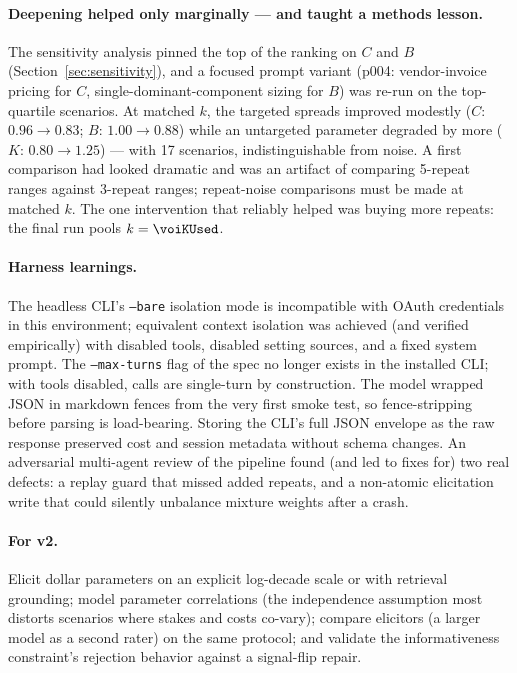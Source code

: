 \paragraph{Deepening helped only marginally --- and taught a methods lesson.}
The sensitivity analysis pinned the top of the ranking on $C$ and $B$
(Section~\ref{sec:sensitivity}), and a focused prompt variant (p004:
vendor-invoice pricing for $C$, single-dominant-component sizing for $B$) was
re-run on the top-quartile scenarios. At matched $k$, the targeted spreads
improved modestly ($C$: $0.96 \to 0.83$; $B$: $1.00 \to 0.88$) while an
untargeted parameter degraded by more ($K$: $0.80 \to 1.25$) --- with 17
scenarios, indistinguishable from noise. A first comparison had looked
dramatic and was an artifact of comparing 5-repeat ranges against 3-repeat
ranges; repeat-noise comparisons must be made at matched $k$. The one
intervention that reliably helped was buying more repeats: the final run
pools $k=\voiKUsed$.

\paragraph{Harness learnings.} The headless CLI's \texttt{--bare} isolation
mode is incompatible with OAuth credentials in this environment; equivalent
context isolation was achieved (and verified empirically) with disabled
tools, disabled setting sources, and a fixed system prompt. The
\texttt{--max-turns} flag of the spec no longer exists in the installed CLI;
with tools disabled, calls are single-turn by construction. The model wrapped
JSON in markdown fences from the very first smoke test, so fence-stripping
before parsing is load-bearing. Storing the CLI's full JSON envelope as the
raw response preserved cost and session metadata without schema changes. An
adversarial multi-agent review of the pipeline found (and led to fixes for)
two real defects: a replay guard that missed added repeats, and a
non-atomic elicitation write that could silently unbalance mixture weights
after a crash.

\paragraph{For v2.} Elicit dollar parameters on an explicit log-decade scale
or with retrieval grounding; model parameter correlations (the independence
assumption most distorts scenarios where stakes and costs co-vary); compare
elicitors (a larger model as a second rater) on the same protocol; and
validate the informativeness constraint's rejection behavior against a
signal-flip repair.
